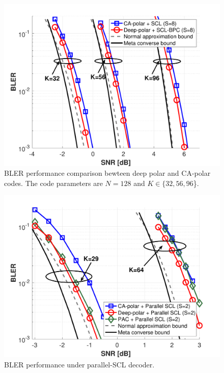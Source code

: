 \documentclass[conference]{IEEEtran}
\begin{document}
\begin{figure}[t]
\centering
\includegraphics[width=1.1\columnwidth]{BLER_CA_polar.pdf}
\caption{BLER performance comparison bewteen deep polar and CA-polar codes. The code parameters are $N=128$ and $K\in\{32, 56, 96$\}.}
\label{fig:BLER-CA-Polar}
\end{figure}
 
 


\begin{figure}[t]
\centering
\includegraphics[width=1.1\columnwidth]{BLER_PAC_parallel.pdf}
\caption{BLER performance under parallel-SCL decoder.}
\label{fig:BLER-PAC-parallel}
\end{figure}
\end{document}
